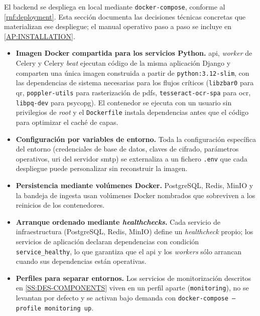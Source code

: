 El backend se despliega en local mediante \texttt{docker-compose},
conforme al \cref{rnf:deployment}. Esta sección documenta las decisiones
técnicas concretas que materializan ese despliegue; el manual operativo
paso a paso se incluye en \cref{AP:INSTALLATION}.

\begin{itemize}

  \item \textbf{Imagen Docker compartida para los servicios Python.}
  \acs{api}, \textit{worker} de Celery y Celery \textit{beat} ejecutan
  código de la misma aplicación Django y comparten una única imagen
  construida a partir de \texttt{python:3.12-slim}, con las dependencias
  de sistema necesarias para los flujos críticos
  (\texttt{libzbar0} para \acs{qr}, \texttt{poppler-utils} para
  rasterización de \acsp{pdf}, \texttt{tesseract-ocr-spa} para \acs{ocr},
  \texttt{libpq-dev} para psycopg). El contenedor se ejecuta con un
  usuario sin privilegios de \textit{root} y el \texttt{Dockerfile}
  instala dependencias antes que el código para optimizar el caché de
  capas.

  \item \textbf{Configuración por variables de entorno.} Toda la
  configuración específica del entorno (credenciales de base de datos,
  claves de cifrado, parámetros operativos, \acs{uri} del servidor
  \acs{smtp}) se externaliza a un fichero \texttt{.env} que cada
  despliegue puede personalizar sin reconstruir la imagen.

  \item \textbf{Persistencia mediante volúmenes Docker.} PostgreSQL,
  Redis, MinIO y la bandeja de ingesta usan volúmenes Docker nombrados
  que sobreviven a los reinicios de los contenedores.

  \item \textbf{Arranque ordenado mediante \textit{healthchecks}.} Cada
  servicio de infraestructura (PostgreSQL, Redis, MinIO) define un
  \textit{healthcheck} propio; los servicios de aplicación declaran
  dependencias con condición \texttt{service\_healthy}, lo que garantiza
  que el \acs{api} y los \textit{workers} sólo arrancan cuando sus
  dependencias están operativas.

  \item \textbf{Perfiles para separar entornos.} Los servicios de
  monitorización descritos en \cref{SS:DES-COMPONENTS} viven en un
  perfil aparte (\texttt{monitoring}), no se levantan por defecto y se
  activan bajo demanda con
  \texttt{docker-compose --profile monitoring up}.

\end{itemize}
